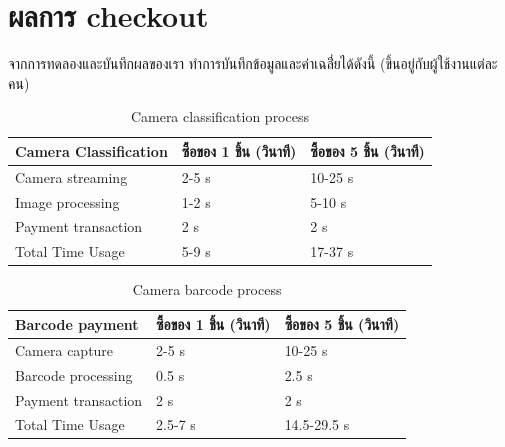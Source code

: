 \section{ผลการ checkout}
จากการทดลองและบันทึกผลของเรา ทำการบันทึกข้อมูลและค่าเฉลี่่ยได้ดังนี้
(ขึ้นอยู่กับผู้ใช้งานแต่ละคน)
\begin{table}[]
    \centering
    \caption{Camera classification process}
    \begin{tabular}{|p{5cm}|p{4cm}|p{4cm}|}
        \hline
        \textbf{Camera Classification} & \textbf{ซื้อของ 1 ชิ้น (วินาที)} & \textbf{ซื้อของ 5 ชิ้น (วินาที)} \\
        \hline
        Camera streaming               & 2-5 s                         & 10-25 s                       \\
        Image processing               & 1-2 s                         & 5-10 s                        \\
        Payment transaction            & 2 s                           & 2 s                           \\
        \hline
        Total Time Usage               & 5-9 s                         & 17-37 s                       \\
        \hline
    \end{tabular}
\end{table}


\begin{table}[]
    \centering
    \caption{Camera barcode process}
    \begin{tabular}{|p{5cm}|p{4cm}|p{4cm}|}
        \hline
        \textbf{Barcode payment} & \textbf{ซื้อของ 1 ชิ้น (วินาที)} & \textbf{ซื้อของ 5 ชิ้น (วินาที)} \\
        \hline
        Camera capture           & 2-5 s                         & 10-25 s                       \\
        Barcode processing       & 0.5 s                         & 2.5 s                         \\
        Payment transaction      & 2 s                           & 2 s                           \\
        \hline
        Total Time Usage         & 2.5-7 s                       & 14.5-29.5 s                   \\
        \hline
    \end{tabular}
\end{table}



